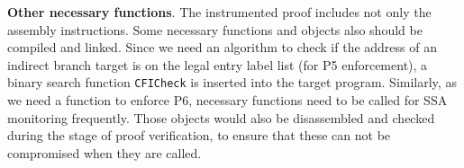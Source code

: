 \vspace{3pt}\noindent\textbf{Other necessary functions}. The instrumented proof includes not only the assembly instructions. Some necessary functions and objects also should be compiled and linked.
Since we need an algorithm to check if the address of an indirect branch target is on the legal entry label list (for P5 enforcement), a binary search function \verb|CFICheck| is inserted into the target program.
Similarly, as we need a function to enforce P6, necessary functions need to be called for SSA monitoring frequently. 
Those objects would also be disassembled and checked during the stage of proof verification, to ensure that these can not be compromised when they are called.


